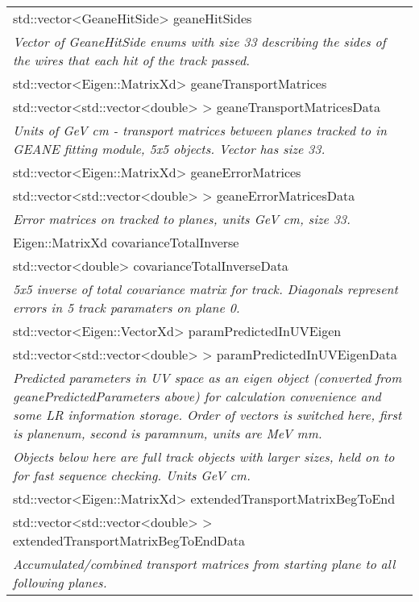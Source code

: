 \begin{longtable}{|p{16cm}|}
std::vector\textless{}GeaneHitSide\textgreater{} geaneHitSides \\
\textit{Vector of GeaneHitSide enums with size 33 describing the sides of the wires that each hit of the track passed.} \\ \hline
 

std::vector\textless{}Eigen::MatrixXd\textgreater{} geaneTransportMatrices \\
std::vector\textless{}std::vector\textless{}double\textgreater{} \textgreater{} geaneTransportMatricesData \\ 
\textit{Units of GeV cm - transport matrices between planes tracked to in GEANE fitting module, 5x5 objects. Vector has size 33.} \\ \hline

std::vector\textless{}Eigen::MatrixXd\textgreater{} geaneErrorMatrices \\ 
std::vector\textless{}std::vector\textless{}double\textgreater{} \textgreater{} geaneErrorMatricesData \\ 
\textit{Error matrices on tracked to planes, units GeV cm, size 33.} \\ \hline

Eigen::MatrixXd covarianceTotalInverse \\
std::vector\textless{}double\textgreater{} covarianceTotalInverseData \\
\textit{5x5 inverse of total covariance matrix for track. Diagonals represent errors in 5 track paramaters on plane 0.} \\ \hline

std::vector\textless{}Eigen::VectorXd\textgreater{} paramPredictedInUVEigen \\ 
std::vector\textless{}std::vector\textless{}double\textgreater{} \textgreater{} paramPredictedInUVEigenData \\ 
\textit{Predicted parameters in UV space as an eigen object (converted from geanePredictedParameters above) for calculation convenience and some LR information storage. Order of vectors is switched here, first is planenum, second is paramnum, units are MeV mm.} \\ \hline

\textit{Objects below here are full track objects with larger sizes, held on to for fast sequence checking. Units GeV cm.} \\ \hline

std::vector\textless{}Eigen::MatrixXd\textgreater{} extendedTransportMatrixBegToEnd \\
std::vector\textless{}std::vector\textless{}double\textgreater{} \textgreater{} extendedTransportMatrixBegToEndData \\ 
\textit{Accumulated/combined transport matrices from starting plane to all following planes.} \\ \hline


\end{longtable}

